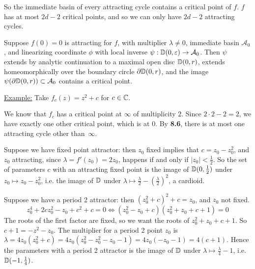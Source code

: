 \documentclass[10pt,a4paper]{article}
\begin{document}
So the immediate basin of every attracting cycle contains a critical point of $f$. $f$ has at most $2d-2$ critical points, and so we can only have $2d-2$ attracting cycles.

\begin{theorem}
  Suppose $f(0)=0$ is attracting for $f$, with multiplier $\lambda \neq 0$, immediate basin $\mathcal{A}_0$, and linearizing coordinate $\phi$ with local inverse $\psi : \mathbb{D}(0, \varepsilon) \to \mathcal{A}_0$. Then $\psi$ extends by analytic continuation to a maximal open disc $\mathbb{D}(0, r)$, extends homeomorphically over the boundary circle $\partial \mathbb{D}(0, r)$, and the image $\psi(\partial \mathbb{D}(0, r)) \subset \mathcal{A}_0$ contains a critical point.
\end{theorem}
\underline{Example:} Take $f_c(z) = z^2+c$ for $c \in \mathbb{C}$.

We know that $f_c$ has a critical point at $\infty$ of multiplicity $2$. Since $2\cdot 2-2=2$, we have exactly one other critical point, which is at 0. By \textbf{8.6}, there is at most one attracting cycle other \mbox{than $\infty$.}

Suppose we have fixed point attractor: then $z_0$ fixed implies that $c = z_0 - z_0^2$, and $z_0$ attracting, since $\lambda =  f'(z_0) = 2z_0$, happens if and only if $|z_0| <\frac{1}{2}$. So the set of parameters $c$ with an attracting fixed point is the image of $\mathbb{D}(0, \frac{1}{2})$ under $z_0 \mapsto z_0-z_0^2$, i.e. the image of $\mathbb{D}$ under $\lambda \mapsto \frac{\lambda}{2} - \left(\frac{\lambda}{2}\right)^2$, a cardioid.

Suppose we have a period 2 attractor: then $(z_0^2+c)^2 +c = z_0$, and $z_0$ not fixed.
\[z_0^4+2cz_0^2-z_0 + c^2 + c = 0 \iff (z_0^2-z_0 + c)(z_0^2+z_0+c+1) = 0\]
The roots of the first factor are fixed, so we want the roots of $z_0^2+z_0+c+1$. So $c+1 = -z^2-z_0$. The multiplier for a period 2 point $z_0$ is \mbox{$\lambda = 4z_0(z_0^2+c)=4z_0(z_0^2-z_0^2-z_0-1) = 4z_0(-z_0-1) = 4(c+1)$.} Hence the parameters with a period 2 attractor is the image of $\mathbb{D}$ under $\lambda \mapsto \frac{\lambda}{4}-1$, i.e.  $\mathbb{D}(-1, \frac{1}{4})$.
\end{document}
